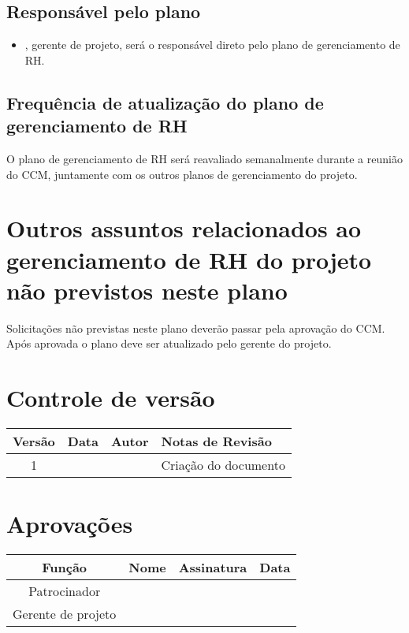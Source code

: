 \subsection{Responsável pelo plano}

\begin{itemize}
	\item \projectManagerName{}, gerente de projeto, será o responsável direto pelo plano de gerenciamento de RH.
\end{itemize}

\subsection{Frequência de atualização do plano de gerenciamento de RH}

O plano de gerenciamento de RH será reavaliado semanalmente durante a reunião do CCM, juntamente com os outros planos de gerenciamento do projeto.

\section{Outros assuntos relacionados ao gerenciamento de RH do projeto não previstos neste plano}

Solicitações não previstas neste plano deverão passar pela aprovação do CCM. Após aprovada o plano deve ser atualizado pelo gerente do projeto.

\section{Controle de versão}

\begin{table}[H]
	\begin{tabularx}{\textwidth}{| c | c | X | X |}
		\hline
		\textbf{Versão} & \textbf{Data} & \textbf{Autor}        & \textbf{Notas de Revisão} \\
		\hline
		1                &               & \projectManagerName{} & Criação do documento     \\
		\hline
	\end{tabularx}
	\centering
\end{table}

\section{Aprovações}

\begin{table}[H]
	\begin{tabularx}{\textwidth}{| c | c | X | c |}
		\hline
		\textbf{Função}  & \textbf{Nome}         & \textbf{Assinatura}        & \textbf{Data} \\
		\hline
		Patrocinador       & \projectSponsorName{} & \projectSponsorSignature{} &               \\
		\hline
		Gerente de projeto & \projectManagerName{} & \projectManagerSignature{} &               \\
		\hline
	\end{tabularx}
	\centering
\end{table}